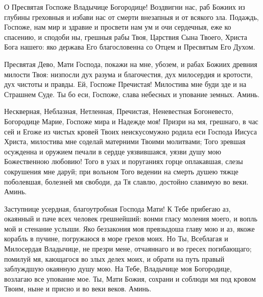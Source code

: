 \begin{mymulticols}





О Пресвятая Госпоже Владычице Богородице! Воздвигни нас, раб Божиих  из глубины греховныя и избави нас от смерти внезапныя и от всякого зла. Подаждь, Госпоже, нам мир и здравие и просвети нам ум и очи сердечныя, еже ко спасению, и сподоби ны, грешныя рабы Твоя, Царствия Сына Твоего, Христа Бога нашего: яко держава Его благословенна со Отцем и Пресвятым Его Духом.




Пресвятая Дево, Мати Господа, покажи на мне, убозем, и рабах Божиих  древния милости Твоя: низпосли дух разума и благочестия, дух милосердия и кротости, дух чистоты и правды. Ей, Госпоже Пречистая! Милостива мне буди зде и на Страшнем Суде. Ты бо еси, Госпоже, слава небесных и упование земных. Аминь.




Нескверная, Неблазная, Нетленная, Пречистая, Неневестная Богоневесто, Богородице Марие, Госпоже мира и Надежде моя! Призри на мя, грешнаго, в час сей и Егоже из чистых кровей Твоих неискусомужно родила еси Господа Иисуса Христа, милостива мне соделай матерними Твоими молитвами; Того зревшая осужденна и оружием печали в сердце уязвившаяся, уязви душу мою Божественною любовию! Того в узах и поруганиях горце оплакавшая, слезы сокрушения мне даруй; при вольном Того ведении на смерть душею тяжце поболевшая, болезней мя свободи, да Тя славлю, достойно славимую во веки. Аминь.




Заступнице усердная, благоутробная Господа Мати! К Тебе прибегаю аз, окаянный и паче всех человек грешнейший: вонми гласу моления моего, и вопль мой и стенание услыши. Яко беззакония моя превзыдоша главу мою и аз, якоже корабль в пучине, погружаюся в море грехов моих. Но Ты, Всеблагая и Милосердая Владычице, не презри мене, отчаяннаго и во гресех погибающаго; помилуй мя, кающагося во злых делех моих, и обрати на путь правый заблуждшую окаянную душу мою. На Тебе, Владычице моя Богородице, возлагаю все упование мое. Ты, Мати Божия, сохрани и соблюди мя под кровом Твоим, ныне и присно и во веки веков. Аминь.





\end{mymulticols}
